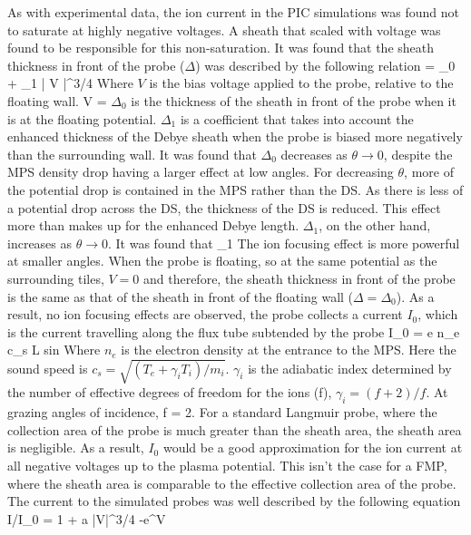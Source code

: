 As with experimental data, the ion current in the PIC simulations was found not to saturate at highly negative voltages. A sheath that scaled with voltage was found to be responsible for this non-saturation. It was found that the sheath thickness in front of the probe ($\Delta$) was described by the following relation
\be 
\Delta  = \Delta_0 + \Delta_1 {\left| V \right|}^{3/4}
\ee
Where $V$ is the bias voltage applied to the probe, relative to the floating wall.
\be 
V = 
\ee 
$\Delta_0$ is the thickness of the sheath in front of the probe when it is at the floating potential. $\Delta_1$ is a coefficient that takes into account the enhanced thickness of the Debye sheath when the probe is biased more negatively than the surrounding wall.  It was found that $\Delta_0$ decreases as $\theta \to 0$, despite the MPS density drop having a larger effect at low angles. For decreasing $\theta$, more of the potential drop is contained in the MPS rather than the DS. As there is less of a potential drop across the DS, the thickness of the DS is reduced. This effect more than makes up for the enhanced Debye length. $\Delta_1$, on the other hand, increases as $\theta \to 0$. It was found that 
\be 
\Delta_1 \approx {}
\ee
The ion focusing effect is more powerful at smaller angles. When the probe is floating, so at the same potential as the surrounding tiles, $V = 0$ and therefore, the sheath thickness in front of the probe is the same as that of the sheath in front of the floating wall ($\Delta = \Delta_0$). As a result, no ion focusing effects are observed, the probe collects a current $I_0$, which is the current travelling along the flux tube subtended by the probe 
\be 
I_0 = e n_e c_s L sin \theta 
\ee 
Where $n_e$ is the electron density at the entrance to the MPS. Here the sound speed is $c_s = \sqrt{(T_e + \gamma_i T_i)/m_i}$. $\gamma_i$ is the adiabatic index determined by the number of effective degrees of freedom for the ions (f), $\gamma_i =(f+2)/f$. At grazing angles of incidence, f = 2. For a standard Langmuir probe, where the collection area of the probe is much greater than the sheath area, the sheath area is negligible. As a result, $I_0$ would be a good approximation for the ion current at all negative voltages up to the plasma potential. This isn't the case for a FMP, where the sheath area is comparable to the effective collection area of the probe. The current to the simulated probes was well described by the following equation 
\be 
I/I_0 = 1 + a {\left|V\right|}^{3/4} -e^V
\label{eq:IV}
